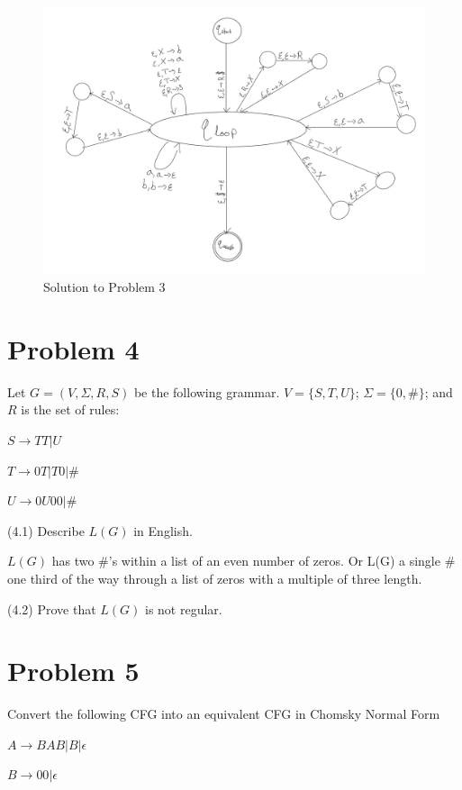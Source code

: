 \documentclass[11pt]{article}
\begin{document}
\begin{figure}[h!]
\includegraphics[scale=1]{problem3.png} 
\caption{Solution to Problem 3}
\end{figure}



\newpage
\section*{Problem 4}

\noindent
Let $G=(V,\Sigma,R,S)$ be the following grammar. $V=\{S,T,U\}$;
$\Sigma=\{0,\#\}$; and $R$ is the set of rules:

$S\rightarrow TT|U$

$T\rightarrow 0T|T0|\#$

$U\rightarrow 0U00|\#$

\noindent
(4.1) Describe $L(G)$ in English.
\newline

$L(G)$ has two $\#$'s within a list of an even number of zeros. Or L(G) a single $\#$ one third of the way through a list of zeros with a multiple of three length.

\noindent
(4.2) Prove that $L(G)$ is not regular.


\newpage
\section*{Problem 5}

\noindent
Convert the following CFG into an equivalent CFG in Chomsky Normal Form

$A\rightarrow BAB|B|\epsilon$

$B\rightarrow 00|\epsilon$
\end{document}
